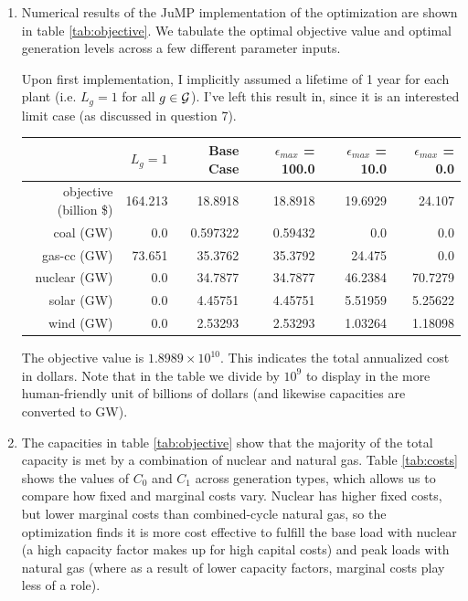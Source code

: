 \documentclass{homework}
\begin{document}
\begin{enumerate}
\section{Part 2}

\item Numerical results of the JuMP implementation of the optimization are shown in table
\ref{tab:objective}.
We tabulate the optimal objective value and optimal generation levels across a
few different parameter inputs.

Upon first implementation, I implicitly assumed a lifetime of 1 year for each plant
(i.e. $L_g = 1$ for all $g\in\mathcal{G}$). I've left this result in, since it is an interested
limit case (as discussed in question 7).

\begin{center}
    
\begin{tabular}{rrrrrr}
    \hline
     & $L_g=1$ & Base Case
        & $\epsilon_{max}$ = 100.0
        & $\epsilon_{max}$ = 10.0 & $\epsilon_{max}$ = 0.0 \\
    \hline
    objective (billion \$) & 164.213 & 18.8918 & 18.8918 & 19.6929 & 24.107 \\
    coal (GW) & 0.0 & 0.597322 & 0.59432 & 0.0 & 0.0 \\
    gas-cc (GW) & 73.651 & 35.3762 & 35.3792 & 24.475 & 0.0 \\
    nuclear (GW) & 0.0 & 34.7877 & 34.7877 & 46.2384 & 70.7279 \\
    solar (GW) & 0.0 & 4.45751 & 4.45751 & 5.51959 & 5.25622 \\
    wind (GW) & 0.0 & 2.53293 & 2.53293 & 1.03264 & 1.18098 \\\hline
\end{tabular}
    \label{tab:objective}
\end{center}


The objective value is $1.8989 \times 10^{10}$. This indicates the total annualized cost in dollars.
Note that in the table we divide by $10^9$ to display in the more human-friendly unit of billions
of dollars (and likewise capacities are converted to GW).

\item The capacities in table \ref{tab:objective} show that the majority of the total capacity
is met by a combination of nuclear and natural gas. Table \ref{tab:costs} shows the values of $C_0$
and $C_1$ across generation types, which allows us to compare how fixed and marginal
costs vary. Nuclear has higher fixed costs, but lower marginal costs than combined-cycle
natural gas, so the optimization finds it is more cost effective to fulfill the base load
with nuclear (a high capacity factor makes up for high capital costs) and peak loads
with natural gas (where as a result of lower capacity factors, marginal costs play less of a role).


\end{enumerate}
\end{document}
